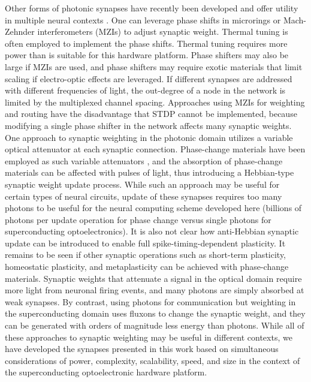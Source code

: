 \documentclass[twocolumn]{article}
\begin{document}
Other forms of photonic synapses have recently been developed and offer utility in multiple neural contexts \cite{prsh2017,tana20142,tafe2017,shha2016,chri2017,humi2018}. One can leverage phase shifts in microrings \cite{tana20142,tafe2017} or Mach-Zehnder interferometers (MZIs) \cite{shha2016} to adjust synaptic weight. Thermal tuning is often employed to implement the phase shifts. Thermal tuning requires more power than is suitable for this hardware platform. Phase shifters may also be large if MZIs are used, and phase shifters may require exotic materials that limit scaling if electro-optic effects are leveraged. If different synapses are addressed with different frequencies of light, the out-degree of a node in the network is limited by the multiplexed channel spacing. Approaches using MZIs for weighting and routing have the disadvantage that STDP cannot be implemented, because modifying a single phase shifter in the network affects many synaptic weights. One approach to synaptic weighting in the photonic domain utilizes a variable optical attenuator at each synaptic connection. Phase-change materials have been employed as such variable attenuators \cite{chri2017}, and the absorption of phase-change materials can be affected with pulses of light, thus introducing a Hebbian-type synaptic weight update process. While such an approach may be useful for certain types of neural circuits, update of these synapses requires too many photons to be useful for the neural computing scheme developed here (billions of photons per update operation for phase change versus single photons for superconducting optoelectronics). It is also not clear how anti-Hebbian synaptic update can be introduced to enable full spike-timing-dependent plasticity. It remains to be seen if other synaptic operations such as short-term plasticity, homeostatic plasticity, and metaplasticity can be achieved with phase-change materials. Synaptic weights that attenuate a signal in the optical domain require more light from neuronal firing events, and many photons are simply absorbed at weak synapses. By contrast, using photons for communication but weighting in the superconducting domain uses fluxons to change the synaptic weight, and they can be generated with orders of magnitude less energy than photons. While all of these approaches to synaptic weighting may be useful in different contexts, we have developed the synapses presented in this work based on simultaneous considerations of power, complexity, scalability, speed, and size in the context of the superconducting optoelectronic hardware platform.
\end{document}
